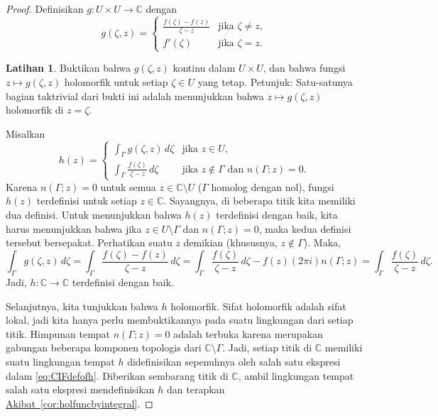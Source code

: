 \documentclass[12pt,openany]{book}
\newcommand{\C}{{\mathbb{C}}}
\theoremstyle{plain}
\theoremstyle{remark}
\theoremstyle{definition}
\newenvironment{exbox}{%
    \def\FrameCommand{\vrule width 1pt \relax\hspace{10pt}}%
    \MakeFramed{\advance\hsize-\width\FrameRestore}%
}{%
    \endMakeFramed
}
\theoremstyle{exercise}
\newtheorem{exercise}{Latihan}[section]
\theoremstyle{example}
\newcommand{\corref}[1]{\hyperref[#1]{Akibat~\ref*{#1}}}
\begin{document}
\begin{proof}
Definisikan $g \colon U \times U \to \C$ dengan
\begin{equation*}
g(\zeta,z) =
\begin{cases}
\frac{f(\zeta)-f(z)}{\zeta-z} & \text{jika } \zeta \neq z , \\
f'(\zeta)                 & \text{jika } \zeta = z .
\end{cases}
\end{equation*}

\begin{exbox}
\begin{exercise}
Buktikan bahwa $g(\zeta,z)$ kontinu dalam $U \times U$, dan bahwa
fungsi $z \mapsto g(\zeta,z)$ holomorfik untuk setiap $\zeta \in U$ yang tetap.
Petunjuk: Satu-satunya bagian taktrivial dari bukti ini adalah menunjukkan bahwa $z \mapsto
g(\zeta,z)$
holomorfik di $z=\zeta$.
\end{exercise}
\end{exbox}

Misalkan
\begin{equation}\label{eq:CIFdefofh}
h(z) = 
\begin{cases}
\int_\Gamma g(\zeta,z) \, d\zeta & \text{jika } z \in U , \\
\int_\Gamma \frac{f(\zeta)}{\zeta-z} \, d\zeta & \text{jika } z \not \in
\Gamma \text{ dan } n(\Gamma;z) = 0 .
\end{cases}
\end{equation}
Karena $n(\Gamma;z) = 0$ untuk semua $z \in \C \setminus U$
($\Gamma$ homolog dengan nol),
fungsi $h(z)$ terdefinisi untuk setiap $z \in \C$.
Sayangnya, di beberapa titik
kita memiliki dua definisi.
Untuk menunjukkan bahwa $h(z)$ terdefinisi dengan baik, kita harus menunjukkan bahwa jika
$z \in U \setminus \Gamma$ dan
$n(\Gamma;z) = 0$, maka kedua definisi tersebut bersepakat.
Perhatikan suatu $z$ demikian (khususnya, $z \notin \Gamma$).  Maka,
\begin{equation*}
\int_\Gamma g(\zeta,z) \, d\zeta
=
\int_\Gamma \frac{f(\zeta)-f(z)}{\zeta-z} \, d\zeta
=
\int_\Gamma \frac{f(\zeta)}{\zeta-z} \, d\zeta
-
f(z) (2\pi i) n(\Gamma;z)
=
\int_\Gamma \frac{f(\zeta)}{\zeta-z} \, d\zeta .
\end{equation*}
Jadi, $h \colon \C \to \C$ terdefinisi dengan baik.

Selanjutnya, kita tunjukkan bahwa $h$
holomorfik.
Sifat holomorfik adalah sifat lokal, jadi kita hanya perlu membuktikannya 
pada suatu lingkungan dari setiap titik.
Himpunan tempat $n(\Gamma;z) = 0$ adalah terbuka karena merupakan
gabungan beberapa komponen topologis dari $\C \setminus \Gamma$.
Jadi, setiap titik di $\C$ memiliki suatu lingkungan tempat $h$ didefinisikan
sepenuhnya oleh salah satu ekspresi dalam \eqref{eq:CIFdefofh}.
Diberikan sembarang titik di $\C$,
ambil lingkungan tempat salah satu ekspresi mendefinisikan
$h$ dan terapkan \corref{cor:holfuncbyintegral}.


\end{proof}
\end{document}
